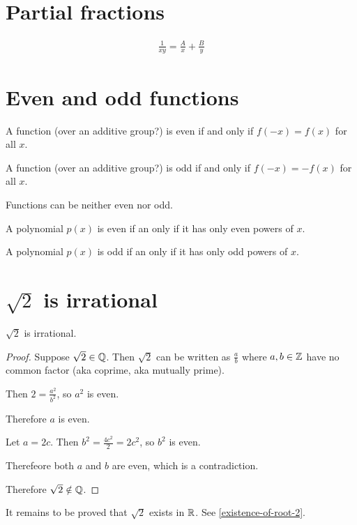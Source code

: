 \section{Partial fractions}

\begin{align*}
  \frac{1}{xy} = \frac{A}{x} + \frac{B}{y}
\end{align*}

\section{Even and odd functions}

\begin{definition*}
  A function (over an additive group?) is even if and only if $f(-x) = f(x)$ for all $x$.

  A function (over an additive group?) is odd if and only if $f(-x) = -f(x)$ for all $x$.
\end{definition*}

Functions can be neither even nor odd.

\begin{claim*}
  A polynomial $p(x)$ is even if an only if it has only even powers of $x$.

  A polynomial $p(x)$ is odd if an only if it has only odd powers of $x$.
\end{claim*}

\section{$\sqrt{2}$ is irrational}
\begin{claim*}
  $\sqrt{2}$ is irrational.
\end{claim*}

\begin{proof}
  Suppose $\sqrt{2} \in \mathbb{Q}$. Then $\sqrt{2}$ can be written as $\frac{a}{b}$ where $a, b \in \mathbb{Z}$
  have no common factor (aka coprime, aka mutually prime).

  Then $2 = \frac{a^2}{b^2}$, so $a^2$ is even.

  Therefore $a$ is even.

  Let $a = 2c$. Then $b^2 = \frac{4c^2}{2} = 2c^2$, so $b^2$ is even.

  Therefeore both $a$ and $b$ are even, which is a contradiction.

  Therefore $\sqrt{2} \notin \mathbb{Q}$.
\end{proof}

\begin{remark*}
  It remains to be proved that $\sqrt{2}$ exists in $\mathbb{R}$. See \ref{existence-of-root-2}.
\end{remark*}

